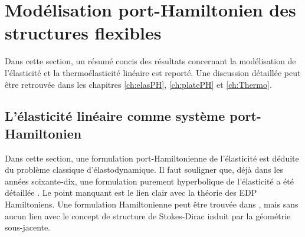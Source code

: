 \section{Mod\'elisation port-Hamiltonien des structures flexibles}

Dans cette section, un résumé concis des résultats concernant la modélisation de l'élasticité et la thermoélasticité linéaire est reporté. Une discussion détaillée peut être retrouvée dans les chapitres \ref{ch:elasPH}, \ref{ch:platePH} et \ref{ch:Thermo}.


\subsection*{L'élasticité linéaire comme système port-Hamiltonien}

Dans cette section, une formulation port-Hamiltonienne de l'élasticité est déduite du problème classique d'élastodynamique. Il faut souligner que, déjà dans les années soixante-dix, une formulation purement hyperbolique de l'élasticité a été détaillée \cite{hughes1978classical}. Le point manquant est le lien clair avec la théorie des EDP Hamiltoniens. Une formulation Hamiltonienne peut être trouvée dans \cite[Chapitre 16]{grinfield2015}, mais sans aucun lien avec le concept de structure de Stokes-Dirac induit par la géométrie sous-jacente. \\


